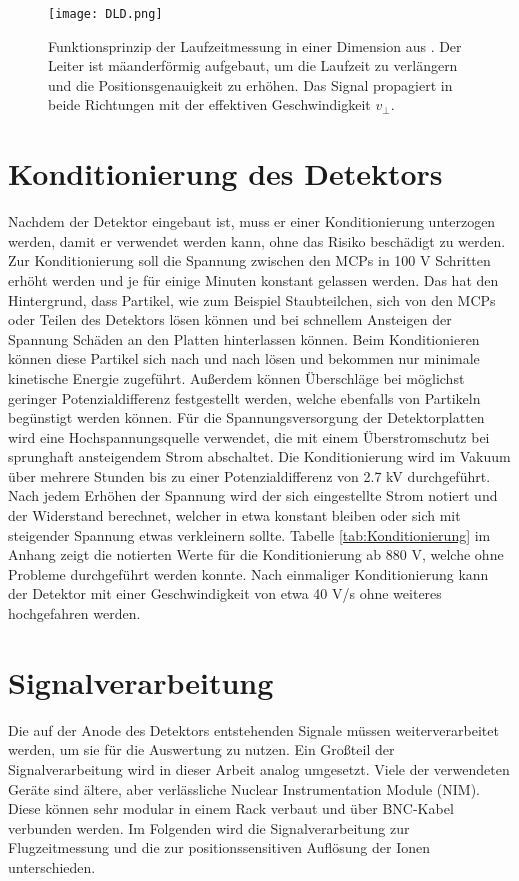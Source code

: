 \begin{figure}
    \centering
    \texttt{[image: DLD.png]}
    \caption[Funktionsprinzip der Laufzeitmessung des Detektors]{Funktionsprinzip der Laufzeitmessung in einer Dimension aus \cite{Detektorsystem}. Der Leiter ist mäanderförmig aufgebaut, um die Laufzeit zu verlängern und die Positionsgenauigkeit zu erhöhen. Das Signal propagiert in beide Richtungen mit der effektiven Geschwindigkeit $v_\perp$.}
    \label{fig:DLD} 
\end{figure}

\section{Konditionierung des Detektors}
Nachdem der Detektor eingebaut ist, muss er einer Konditionierung unterzogen werden, damit er verwendet werden kann, ohne das Risiko beschädigt zu werden. Zur Konditionierung soll die Spannung zwischen den MCPs in 100 V Schritten erhöht werden und je für einige Minuten konstant gelassen werden. Das hat den Hintergrund, dass Partikel, wie zum Beispiel Staubteilchen, sich von den MCPs oder Teilen des Detektors lösen können und bei schnellem Ansteigen der Spannung Schäden an den Platten hinterlassen können. Beim Konditionieren können diese Partikel sich nach und nach lösen und bekommen nur minimale kinetische Energie zugeführt. Außerdem können Überschläge bei möglichst geringer Potenzialdifferenz festgestellt werden, welche ebenfalls von Partikeln begünstigt werden können. Für die Spannungsversorgung der Detektorplatten wird eine Hochspannungsquelle verwendet, die mit einem Überstromschutz bei sprunghaft ansteigendem Strom abschaltet. Die Konditionierung wird im Vakuum über mehrere Stunden bis zu einer Potenzialdifferenz von 2.7 kV durchgeführt. Nach jedem Erhöhen der Spannung wird der sich eingestellte Strom notiert und der Widerstand berechnet, welcher in etwa konstant bleiben oder sich mit steigender Spannung etwas verkleinern sollte. Tabelle \ref{tab:Konditionierung} im Anhang zeigt die notierten Werte für die Konditionierung ab 880 V, welche ohne Probleme durchgeführt werden konnte. Nach einmaliger Konditionierung kann der Detektor mit einer Geschwindigkeit von etwa 40 V/s ohne weiteres hochgefahren werden.

\section{Signalverarbeitung}
Die auf der Anode des Detektors entstehenden Signale müssen weiterverarbeitet werden, um sie für die Auswertung zu nutzen. Ein Großteil der Signalverarbeitung wird in dieser Arbeit analog umgesetzt. Viele der verwendeten Geräte sind ältere, aber verlässliche Nuclear Instrumentation Module (NIM). Diese können sehr modular in einem Rack verbaut und über BNC-Kabel verbunden werden. Im Folgenden wird die Signalverarbeitung zur Flugzeitmessung und die zur positionssensitiven Auflösung der Ionen unterschieden.

